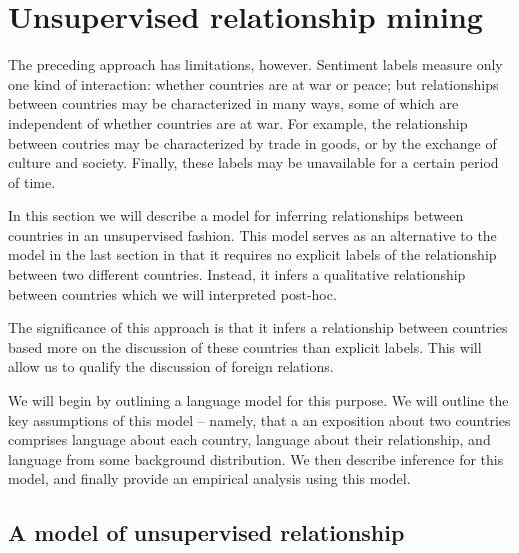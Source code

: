\section*{Unsupervised relationship mining}


The preceding approach has limitations, however.  Sentiment labels
measure only one kind of interaction: whether countries are at war or
peace; but relationships between countries may be characterized in
many ways, some of which are independent of whether countries are at
war.  For example, the relationship between coutries may be
characterized by trade in goods, or by the exchange of culture and
society. Finally, these labels may be unavailable for a certain period
of time.

In this section we will describe a model for inferring relationships
between countries in an unsupervised fashion.  This model serves as an
alternative to the model in the last section in that it requires no
explicit labels of the relationship between two different countries.
Instead, it infers a qualitative relationship between countries which
we will interpreted post-hoc.

The significance of this approach is that it infers a relationship
between countries based more on the discussion of these countries than explicit labels.  This will allow us to qualify the discussion of foreign relations.

We will begin by outlining a language model for this purpose.  We will outline the key assumptions of this model -- namely, that a an exposition about two countries comprises language about each country, language about their relationship, and language from some background distribution. We then describe inference for this model, and finally provide an empirical analysis using this model.

\subsection*{A model of unsupervised relationship}

